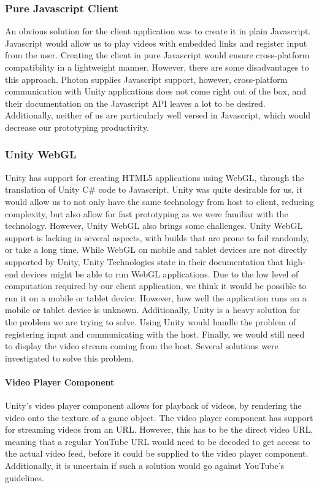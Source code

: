 \subsubsection{Pure Javascript Client}
An obvious solution for the client application was to create it in plain Javascript. Javascript would allow us to play videos with embedded links and register input from the user. Creating the client in pure Javascript would ensure cross-platform compatibility in a lightweight manner. However, there are some disadvantages to this approach. Photon supplies Javascript support, however, cross-platform communication with Unity applications does not come right out of the box\cite{photon_javascript}, and their documentation on the Javascript API leaves a lot to be desired. Additionally, neither of us are particularly well versed in Javascript, which would decrease our prototyping productivity. 

\subsubsection{Unity WebGL}
Unity has support for creating HTML5 applications using WebGL\cite{unity_webgl}, through the translation of Unity C\# code to Javascript. Unity was quite desirable for us, it would allow us to not only have the same technology from host to client, reducing complexity, but also allow for fast prototyping as we were familiar with the technology. 
However, Unity WebGL also brings some challenges. Unity WebGL support is lacking in several aspects, with builds that are prone to fail randomly, or take a long time. While WebGL on mobile and tablet devices are not directly supported by Unity, Unity Technologies state in their documentation that high-end devices might be able to run WebGL applications\cite{unity_webl_browser_support}. Due to the low level of computation required by our client application, we think it would be possible to run it on a mobile or tablet device. However, how well the application runs on a mobile or tablet device is unknown. Additionally, Unity is a heavy solution for the problem we are trying to solve.
Using Unity would handle the problem of registering input and communicating with the host. Finally, we would still need to display the video stream coming from the host. Several solutions were investigated to solve this problem.

\paragraph{Video Player Component}
Unity's video player component allows for playback of videos, by rendering the video onto the texture of a game object\cite{unity_video_player}. The video player component has support for streaming videos from an URL. However, this has to be the direct video URL, meaning that a regular YouTube URL would need to be decoded to get access to the actual video feed, before it could be supplied to the video player component. Additionally, it is uncertain if such a solution would go against YouTube's guidelines\cite[5.1 A]{youtube_guidelines}.

